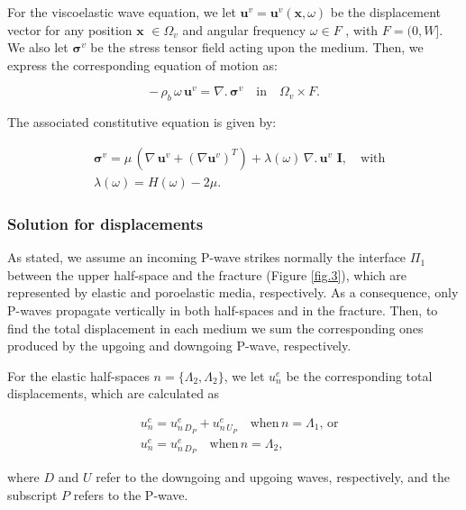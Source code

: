 \documentclass[draft]{agujournal2019}
\begin{document}
For the viscoelastic wave equation, we let $\bm{u}^v=\bm{u}^v (\bm{x},\omega)$ be the displacement vector for any position $\bm{x}$  $ \in \Omega_v$ and angular frequency $\omega \in F$ , with $F =(0,W]$. We also let $\bm{\sigma}^v$ be the stress tensor field acting upon the medium. Then, we express the corresponding equation of motion as:
\begin{linenomath*}
\begin{equation}\label{Eq.16}
- \, \rho_b \,\omega \, \bm{u}^v = \nabla . \, \bm{\sigma}^v \quad \textrm{in} \quad \Omega_v \times F.
\end{equation}
\end{linenomath*}
The associated constitutive equation is given by: 
\begin{linenomath*}
\begin{equation}\label{Eq.17}
\begin{split}
& \bm{\sigma}^v = \mu \,  \left( \nabla \, \bm{u}^v + ({\nabla  \bm{u}^v})^T  \right) + \lambda(\omega) \,  \nabla . \, \bm{u}^v\,\, \bm{I}, \quad \text{with} \\
& \lambda(\omega)= H(\omega)-2\mu.
\end{split}
\end{equation}
\end{linenomath*}

\subsubsection{Solution for displacements}
As stated, we assume an incoming P-wave strikes normally the interface $\Pi_1$  between the upper half-space and the fracture (Figure \ref{fig.3}), which are represented by elastic and poroelastic media, respectively. As a consequence, only P-waves propagate vertically in both half-spaces and in the fracture. Then, to find the total displacement in each medium we sum the corresponding ones produced by the upgoing and downgoing P-wave, respectively.

For the elastic half-spaces $n =\{\Lambda_2, \Lambda_2\}$, we let $u_n^e$ be the corresponding total displacements, which are calculated as
\begin{linenomath*}
\begin{equation}\label{Eq.18}
\begin{split}
& u_n^e=  u_{n\,{D_P}}^e + u_{n\,{U_P}}^e \quad \text{when}\, n=\Lambda_1 , \, \text{or}  \\
& u_n^e = u_{n\,{D_P}}^e \quad \text{when}\, n=\Lambda_2 ,
\end{split}
\end{equation}
\end{linenomath*}
where $D$ and $U$ refer to the downgoing and upgoing waves, respectively, and the subscript $P$ refers to the P-wave.
\end{document}
